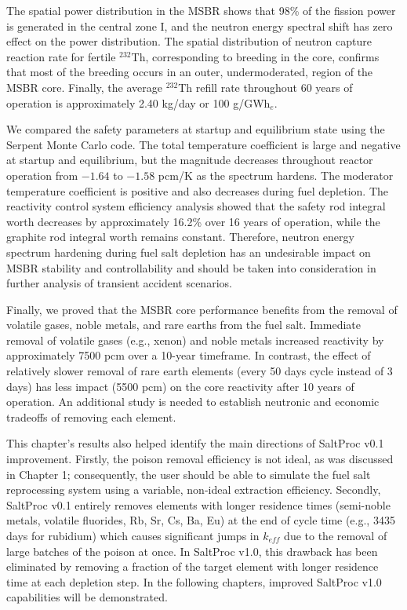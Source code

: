 The spatial power distribution in the \gls{MSBR} shows that 98\% of the 
fission power is generated in the central zone I, and the neutron energy 
spectral shift has zero effect on the power distribution. The 
spatial distribution of neutron capture reaction rate for fertile $^{232}$Th, 
corresponding to breeding in the core, confirms that most of the breeding 
occurs in an outer, undermoderated, region of the \gls{MSBR} core. Finally, 
the average $^{232}$Th refill rate throughout 60 years of operation is 
approximately 2.40 kg/day or 100 g/GWh$_e$.

We compared the safety parameters at startup and equilibrium state using the 
Serpent Monte Carlo code. The total temperature coefficient is large and 
negative at startup 
and equilibrium, but the magnitude decreases throughout reactor operation from 
$-1.64$ to $-1.58$ pcm/K as the spectrum hardens. The moderator temperature 
coefficient is positive and also decreases during fuel depletion. The 
reactivity control system efficiency analysis showed that the safety rod 
integral worth decreases by approximately 16.2\% over 16 years of operation, 
while the graphite rod integral worth remains constant. Therefore, neutron 
energy spectrum hardening during fuel salt depletion has an undesirable impact 
on \gls{MSBR} stability and controllability and should be taken into  
consideration in further analysis of transient accident scenarios.

Finally, we proved that the \gls{MSBR} core performance benefits from the 
removal of volatile gases, noble metals, and rare earths from the fuel salt. 
Immediate removal of volatile gases (e.g., xenon) and noble metals 
increased reactivity by approximately 7500 pcm over a 10-year timeframe. In 
contrast, the effect of relatively slower removal of rare earth elements 
(every 50 days cycle instead of 3 days) has less impact (5500 pcm) on the core 
reactivity after 10 years of operation. An additional study is needed to 
establish neutronic  and economic tradeoffs of removing each element.

This chapter's results also helped identify the main directions of SaltProc 
v0.1 improvement. Firstly, the poison removal efficiency is not ideal, as was 
discussed in Chapter 1; consequently, the user should be able to simulate the 
fuel salt reprocessing system using a variable, non-ideal extraction 
efficiency. Secondly, SaltProc v0.1 entirely removes elements with longer 
residence times (semi-noble metals, volatile fluorides, Rb, Sr, Cs, Ba, Eu) at 
the end of cycle time (e.g., 3435 days for rubidium) which causes significant  
jumps in $k_{eff}$ due to the removal of large batches of the poison at once. 
In SaltProc v1.0, this drawback has been eliminated by removing a fraction of 
the target element with longer residence time at each depletion step. In the 
following chapters, improved SaltProc v1.0 capabilities will be demonstrated.